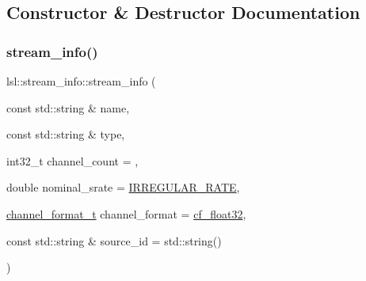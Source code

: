 \subsection{Constructor \& Destructor Documentation}
\mbox{\label{classlsl_1_1stream__info_a874f4899da89168b768cfe9acdd569a0}} 
\subsubsection{\texorpdfstring{stream\+\_\+info()}{stream\_info()}\hspace{0.1cm}{\footnotesize\ttfamily [1/4]}}
{\footnotesize\ttfamily lsl\+::stream\+\_\+info\+::stream\+\_\+info (\begin{DoxyParamCaption}\item[{const std\+::string \&}]{name,  }\item[{const std\+::string \&}]{type,  }\item[{int32\+\_\+t}]{channel\+\_\+count = {},  }\item[{double}]{nominal\+\_\+srate = {\ttfamily \hyperlink{namespacelsl_ac7ebddefe1091ef2d9459b6f9d79f7ab}{I\+R\+R\+E\+G\+U\+L\+A\+R\+\_\+\+R\+A\+TE}},  }\item[{\hyperlink{namespacelsl_a28d50dae6fd82eea8893ce3d63ccd46c}{channel\+\_\+format\+\_\+t}}]{channel\+\_\+format = {\ttfamily \hyperlink{namespacelsl_a28d50dae6fd82eea8893ce3d63ccd46ca46efa3307b337f7de592753642584616}{cf\+\_\+float32}},  }\item[{const std\+::string \&}]{source\+\_\+id = {\ttfamily std\+:\+:string()} }\end{DoxyParamCaption})\hspace{0.3cm}{\ttfamily [inline]}}

